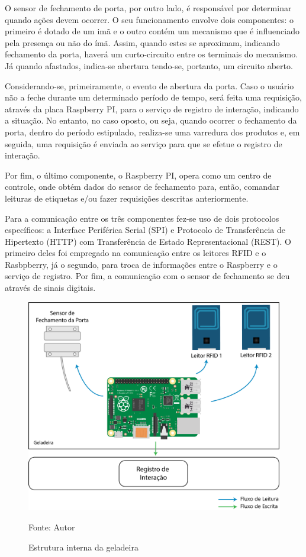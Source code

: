 O sensor de fechamento de porta, por outro lado, é responsável por determinar quando ações devem ocorrer. O seu funcionamento envolve dois componentes: o primeiro é dotado de um imã e o outro contém um mecanismo que é influenciado pela presença ou não do ímã. Assim, quando estes se aproximam, indicando fechamento da porta, haverá um curto-circuito entre os terminais do mecanismo. Já quando afastados, indica-se abertura tendo-se, portanto, um circuito aberto.

Considerando-se, primeiramente, o evento de abertura da porta. Caso o usuário não a feche durante um determinado período de tempo, será feita uma requisição, através da placa Raspberry PI, para o serviço de registro de interação, indicando a situação. No entanto, no caso oposto, ou seja, quando ocorrer o fechamento da porta, dentro do período estipulado, realiza-se uma varredura dos produtos e, em seguida, uma requisição é enviada ao serviço para que se efetue o registro de interação.

Por fim, o último componente, o Raspberry PI, opera como um centro de controle, onde obtém dados do sensor de fechamento para, então, comandar leituras de etiquetas e/ou fazer requisições descritas anteriormente.

Para a comunicação entre os três componentes fez-se uso de dois protocolos específicos: a Interface Periférica Serial (SPI) e Protocolo de Transferência de Hipertexto (HTTP) com Transferência de Estado Representacional (REST). O primeiro deles foi empregado na comunicação entre os leitores RFID e o Rasbpberry, já o segundo, para troca de informações entre o Raspberry e o serviço de registro. Por fim, a comunicação com o sensor de fechamento se deu através de sinais digitais.

\begin{figure}[htb]
    \caption{Estrutura interna da geladeira}
    \label{fig:cap4_estr_geladeira}
    \includegraphics[width=\textwidth]{figuras/c4_modelo-logico-hardware.png}
    
   \footnotesize{Fonte: Autor}
\end{figure}

